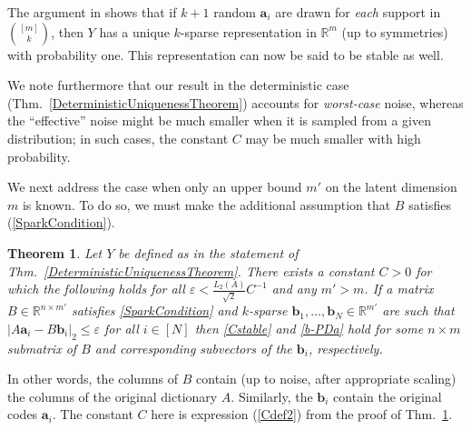 \documentclass[journal, twocolumn]{IEEEtran}
\newtheorem{theorem}{Theorem}
\begin{document}
The argument in \cite{Hillar15} shows that if $k+1$ random $\mathbf{a}_i$ are drawn for \emph{each} support in ${[m] \choose k}$, then $Y$ has a unique $k$-sparse representation in $\mathbb{R}^m$ (up to symmetries) with probability one. This representation can now be said to be stable as well. %

We note furthermore that our result in the deterministic case (Thm.~\ref{DeterministicUniquenessTheorem}) accounts for \emph{worst-case} noise, whereas the ``effective'' noise might be much smaller when it is sampled from a given distribution; in such cases, the constant $C$ may be much smaller with high probability. 

We next address the case when only an upper bound $m'$ on the latent dimension $m$ is known. To do so, we must make the additional assumption that $B$ satisfies (\ref{SparkCondition}). 

\begin{theorem}\label{DeterministicUniquenessTheorem2}
Let $Y$ be defined as in the statement of Thm.~\ref{DeterministicUniquenessTheorem}. There exists a constant $C > 0$ for which the following holds for all $\varepsilon < \frac{L_2(A)}{\sqrt{2}}C^{-1}$ and any $m' > m$. If a matrix $B \in \mathbb{R}^{n \times m'}$ satisfies \eqref{SparkCondition} and $k$-sparse $\mathbf{b}_1, \ldots, \mathbf{b}_N \in \mathbb{R}^{m'}$ are such that \mbox{$|A\mathbf{a}_i - B\mathbf{b}_i|_2 \leq \varepsilon$} for all $i \in [N]$ then \eqref{Cstable} and \eqref{b-PDa} hold for some $n \times m$ submatrix of $B$ and corresponding subvectors of the $\mathbf{b}_i$, respectively. 
\end{theorem}

In other words, the columns of $B$ contain (up to noise, after appropriate scaling) the columns of the original dictionary $A$. Similarly, the $\mathbf{b}_i$ contain the original codes $\mathbf{a}_i$. The constant $C$ here is expression (\ref{Cdef2}) from the proof of Thm.~\ref{DeterministicUniquenessTheorem2}. 
\end{document}
